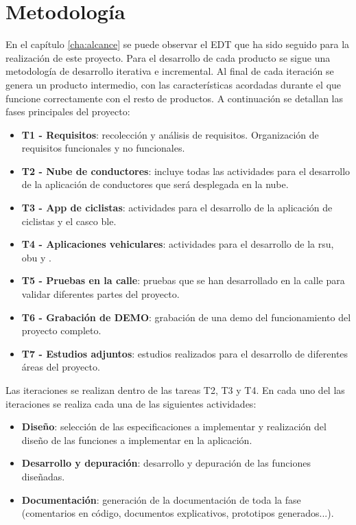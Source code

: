 \chapter{Metodología}\label{cha:metodologia}
En el capítulo \ref{cha:alcance} se puede observar el EDT que ha sido seguido para la realización de este
proyecto. Para el desarrollo de cada producto se sigue una metodología de desarrollo iterativa e incremental.
Al final de cada iteración se genera un producto intermedio, con las características acordadas durante el
que funcione correctamente con el resto de productos.  A continuación se detallan las fases principales
del proyecto:
\begin{itemize}
	\item \textbf{T1 - Requisitos}: recolección y análisis de requisitos. Organización de requisitos funcionales
	y no funcionales.

	\item \textbf{T2 - Nube de conductores}: incluye todas las actividades para el desarrollo de la aplicación de
	conductores que será desplegada en la nube.

	\item \textbf{T3 - App de ciclistas}: actividades para el desarrollo de la aplicación de ciclistas y el
	casco \gls{ble}.

	\item \textbf{T4 - Aplicaciones vehiculares}: actividades para el desarrollo de la \gls{rsu}, \gls{obu} y
	.

	\item \textbf{T5 - Pruebas en la calle}: pruebas que se han desarrollado en la calle para validar diferentes
	partes del proyecto.

	\item \textbf{T6 - Grabación de DEMO}: grabación de una demo del funcionamiento del proyecto completo.

	\item \textbf{T7 - Estudios adjuntos}: estudios realizados para el desarrollo de diferentes áreas del
	proyecto.
\end{itemize}

Las iteraciones se realizan dentro de las tareas T2, T3 y T4. En cada uno del las iteraciones se realiza cada
una de las siguientes actividades:
\begin{itemize}
	\item \textbf{Diseño}: selección de las especificaciones a implementar y realización del diseño de las
	funciones a implementar en la aplicación.

	\item \textbf{Desarrollo y depuración}: desarrollo y depuración de las funciones diseñadas.

	\item \textbf{Documentación}: generación de la documentación de toda la fase (comentarios en código, documentos
	explicativos, prototipos generados...).
\end{itemize}

